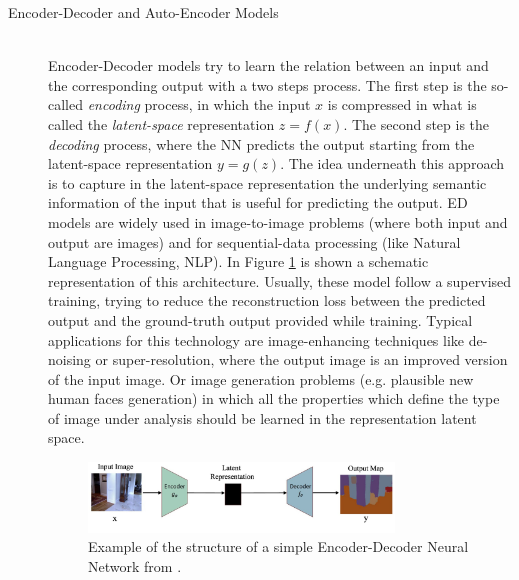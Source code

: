 \begin{description}
    \item [Encoder-Decoder and Auto-Encoder Models] \hfill \\
        Encoder-Decoder models try to learn the relation between an input and the corresponding output with a two steps process. The first step is the so-called \textit{encoding} process, in which the input $x$ is compressed in what is called the \textit{latent-space} representation $z = f(x)$. The second step is the \textit{decoding} process, where the NN predicts the output starting from the latent-space representation $ y = g(z)$. The idea underneath this approach is to capture in the latent-space representation the underlying semantic information of the input that is useful for predicting the output. ED models are widely used in image-to-image problems (where both input and output are images) and for sequential-data processing (like Natural Language Processing, NLP). In Figure \ref{fig:EDNN} is shown a schematic representation of this architecture. Usually, these model follow a supervised training, trying to reduce the reconstruction loss between the predicted output and the ground-truth output provided while training. Typical applications for this technology are image-enhancing techniques like de-noising or super-resolution, where the output image is an improved version of the input image. Or image generation problems (e.g. plausible new human faces generation) in which all the properties which define the type of image under analysis should be learned in the representation latent space.

        \begin{figure}
            \centering
            \includegraphics[width = 0.8\textwidth]{images/EDnet}
            \caption{Example of the structure of a simple Encoder-Decoder Neural Network from  \cite{deep_seg_SOA}.}
            \label{fig:EDNN}
        \end{figure}


\end{description}
